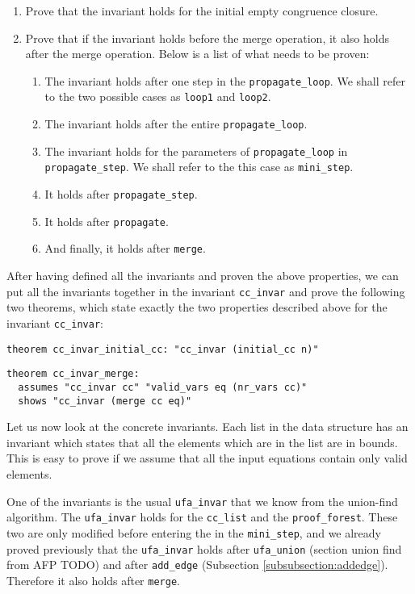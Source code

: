 \begin{enumerate}
	\item Prove that the invariant holds for the initial empty congruence closure.

	\item Prove that if the invariant holds before the merge operation, it also holds after the merge operation. Below is a list of what needs to be proven:
    \begin{enumerate}
        \item The invariant holds after one step in the \lstinline{propagate_loop}. We shall refer to the two possible cases as \lstinline{loop1} and \lstinline{loop2}.
    	\item The invariant holds after the entire \lstinline{propagate_loop}.
    	\item The invariant holds for the parameters of \lstinline{propagate_loop} in \lstinline{propagate_step}. We shall refer to the this case as \lstinline{mini_step}.
    	\item It holds after \lstinline{propagate_step}.
    	\item It holds after \lstinline{propagate}.
    	\item And finally, it holds after \lstinline{merge}.
    \end{enumerate}
\end{enumerate}

After having defined all the invariants and proven the above properties, we can put all the invariants together in the invariant \lstinline{cc_invar} and prove the following two theorems, which state exactly the two properties described above for the invariant \lstinline{cc_invar}:

\begin{lstlisting}
theorem cc_invar_initial_cc: "cc_invar (initial_cc n)"
\end{lstlisting}

\begin{lstlisting}
theorem cc_invar_merge:
  assumes "cc_invar cc" "valid_vars eq (nr_vars cc)"
  shows "cc_invar (merge cc eq)"
\end{lstlisting}

Let us now look at the concrete invariants. Each list in the data structure has an invariant which states that all the elements which are in the list are in bounds. This is easy to prove if we assume that all the input equations contain only valid elements.

One of the invariants is the usual \lstinline{ufa_invar} that we know from the union-find algorithm. The \lstinline{ufa_invar} holds for the \lstinline{cc_list} and the \lstinline{proof_forest}. These two are only modified before entering the in the \lstinline{mini_step}, and we already proved previously that the \lstinline{ufa_invar} holds after \lstinline{ufa_union} (section union find from AFP TODO) and after \lstinline{add_edge} (Subsection \ref{subsubsection:addedge}). Therefore it also holds after \lstinline{merge}.

